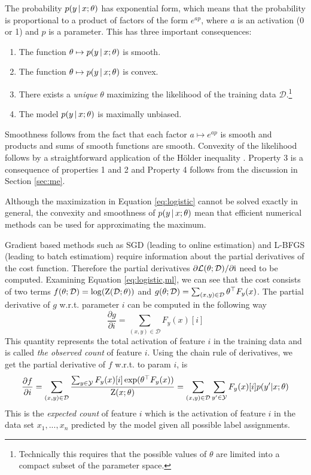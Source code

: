 The probability $p(y\mbox{$ \, | \, $} x\mbox{$ ; \, $} \theta)$ has exponential form,
which means that the probability is proportional to a product of
factors of the form $e^{ap}$, where $a$ is an activation (0 or 1) and
$p$ is a parameter. This has three important consequences:

\begin{enumerate}
\item The function $\theta \mapsto p(y\mbox{$ \, | \, $} x\mbox{$ ; \, $} \theta)$ is smooth.
\item The function $\theta \mapsto p(y\mbox{$ \, | \, $} x\mbox{$ ; \, $} \theta)$ is convex.
\item There exists a {\it unique} $\theta$ maximizing the likelihood of the training data $\mathcal{D}$.\footnote{Technically this requires that the possible values of $\theta$ are limited into a compact subset of the parameter space.}
\item The model $p(y\mbox{$ \, | \, $} x\mbox{$ ; \, $} \theta)$ is maximally unbiased. 
\end{enumerate}

Smoothness follows from the fact that each factor $a \mapsto e^{ap}$
is smooth and products and sums of smooth functions are
smooth. Convexity of the likelihood follows by a straightforward application of the Hölder inequality \cite{}. Property 3 is a consequence of properties 1 and 2 and
Property 4 follows from the discussion in Section \ref{sec:me}.

Although the maximization in Equation \ref{eq:logistic} cannot be
solved exactly in general, the convexity and smoothness of
$p(y\mbox{$ \, | \, $} x\mbox{$ ; \, $} \theta)$ mean that efficient numerical methods can
be used for approximating the maximum.

Gradient based methods such as SGD (leading to online estimation) and
L-BFGS (leading to batch estimatiom) require information about the
partial derivatives of the cost function. Therefore the partial
derivatives $\partial\mathcal{L}(\theta\mbox{$ ; \, $}
\mathcal{D})/\partial\mbox{${\rm i}$}$ need to be computed. Examining Equation
\ref{eq:logistic,ml}, we can see that the cost consists of two terms
$f(\theta\mbox{$ ; \, $} \mathcal{D}) = \log(\mbox{${\rm Z}$}(\mathcal{D}\mbox{$ ; \, $} \theta))$
and $g(\theta\mbox{$ ; \, $}\mathcal{D}) = \sum_{(x,y) \in
  \mathcal{D}}\theta^\top F_y(x)$. The partial derivative of $g$
w.r.t. parameter $i$ can be computed in the following way
$$\frac{\partial g}{\partial i} = \sum_{(x,y) \in \mathcal{D}} F_y(x)[i]$$
This quantity represents the total activation of feature $i$ in the training data and is called {\it the observed count} of feature $i$. Using the chain rule of derivatives, we get the partial derivative of $f$ w.r.t. to param $i$, is
$$\frac{\partial f}{\partial i} = \sum_{(x,y) \in \mathcal{D}} \frac{\sum_{y \in \mathcal{Y}}F_y(x)[i] \exp(\theta^\top F_y(x))}{\mbox{${\rm Z}$}(x\mbox{$ ; \, $}\theta)} = \sum_{(x,y) \in \mathcal{D}} \sum_{y' \in \mathcal{Y}}F_y(x)[i] p(y'|x\mbox{$ ; \, $}\theta)$$
This is the {\it expected count} of feature $i$ which is the
activation of feature $i$ in the data set $x_1, ...,x_n$ predicted by
the model given all possible label assignments.


